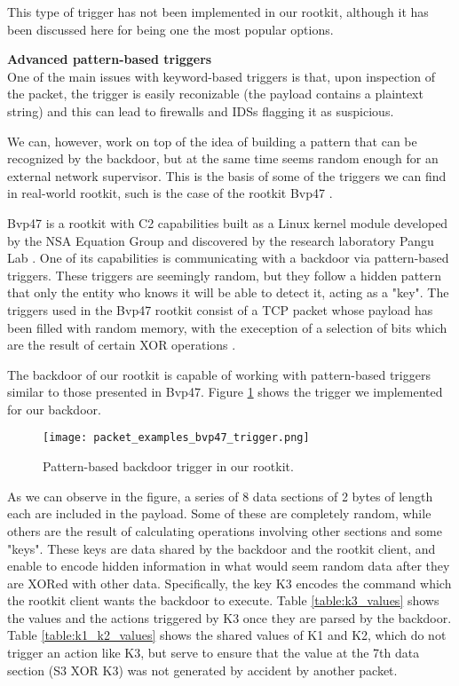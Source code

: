 This type of trigger has not been implemented in our rootkit, although it has been discussed here for being one the most popular options.

\textbf{Advanced pattern-based triggers}\\
One of the main issues with keyword-based triggers is that, upon inspection of the packet, the trigger is easily reconizable (the payload contains a plaintext string) and this can lead to firewalls and IDSs flagging it as suspicious. 

We can, however, work on top of the idea of building a pattern that can be recognized by the backdoor, but at the same time seems random enough for an external network supervisor. This is the basis of some of the triggers we can find in real-world rootkit, such is the case of the rootkit Bvp47 \cite{bvp47_report}. %

Bvp47 is a rootkit with C2 capabilities built as a Linux kernel module developed by the NSA Equation Group and discovered by the research laboratory Pangu Lab \cite{pangu_lab}. One of its capabilities is communicating with a backdoor via pattern-based triggers. These triggers are seemingly random, but they follow a hidden pattern that only the entity who knows it will be able to detect it, acting as a "key". The triggers used in the Bvp47 rootkit consist of a TCP packet whose payload has been filled with random memory, with the exeception of a selection of bits which are the result of certain XOR operations \cite{bvp47_report_p49}.

The backdoor of our rootkit is capable of working with pattern-based triggers similar to those presented in Bvp47. Figure \ref{fig:bvp47_trigger} shows the trigger we implemented for our backdoor.

\begin{figure}[htbp]
	\centering
	\texttt{[image: packet\_examples\_bvp47\_trigger.png]}
	\caption{Pattern-based backdoor trigger in our rootkit.}
	\label{fig:bvp47_trigger}
\end{figure}

As we can observe in the figure, a series of 8 data sections of 2 bytes of length each are included in the payload. Some of these are completely random, while others are the result of calculating operations involving other sections and some "keys". These keys are data shared by the backdoor and the rootkit client, and enable to encode hidden information in what would seem random data after they are XORed with other data. Specifically, the key K3 encodes the command which the rootkit client wants the backdoor to execute. Table \ref{table:k3_values} shows the values and the actions triggered by K3 once they are parsed by the backdoor. Table \ref{table:k1_k2_values} shows the shared values of K1 and K2, which do not trigger an action like K3, but serve to ensure that the value at the 7th data section (S3 XOR K3) was not generated by accident by another packet.

